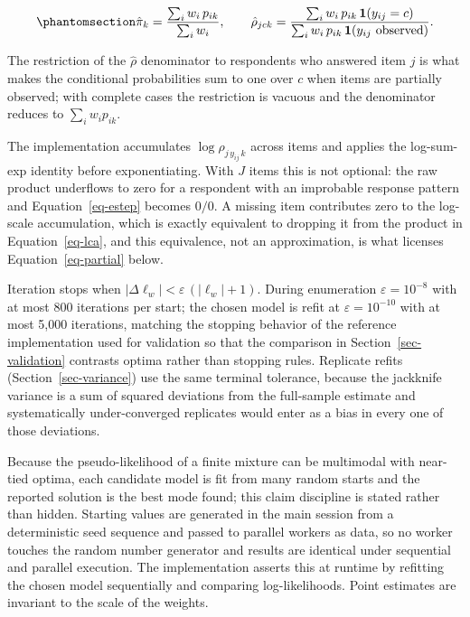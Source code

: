 \documentclass[
  12pt]{article}
\begin{document}
\begin{equation}\phantomsection\label{eq-mstep}{
\hat\pi_k = \frac{\sum_i w_i\, p_{ik}}{\sum_i w_i}, \qquad
\hat\rho_{jck} = \frac{\sum_i w_i\, p_{ik}\, \mathbf{1}(y_{ij} = c)}
{\sum_i w_i\, p_{ik}\, \mathbf{1}(y_{ij} \text{ observed})} .
}\end{equation}

The restriction of the \(\hat\rho\) denominator to respondents who
answered item \(j\) is what makes the conditional probabilities sum to
one over \(c\) when items are partially observed; with complete cases
the restriction is vacuous and the denominator reduces to
\(\sum_i w_i p_{ik}\).

The implementation accumulates \(\log \rho_{j\,y_{ij}\,k}\) across items
and applies the log-sum-exp identity before exponentiating. With \(J\)
items this is not optional: the raw product underflows to zero for a
respondent with an improbable response pattern and
Equation~\ref{eq-estep} becomes \(0/0\). A missing item contributes zero
to the log-scale accumulation, which is exactly equivalent to dropping
it from the product in Equation~\ref{eq-lca}, and this equivalence, not
an approximation, is what licenses Equation~\ref{eq-partial} below.

Iteration stops when \(|\Delta \ell_w| < \varepsilon\,(|\ell_w| + 1)\).
During enumeration \(\varepsilon = 10^{-8}\) with at most 800 iterations
per start; the chosen model is refit at \(\varepsilon = 10^{-10}\) with
at most 5,000 iterations, matching the stopping behavior of the
reference implementation used for validation so that the comparison in
Section~\ref{sec-validation} contrasts optima rather than stopping
rules. Replicate refits (Section~\ref{sec-variance}) use the same
terminal tolerance, because the jackknife variance is a sum of squared
deviations from the full-sample estimate and systematically
under-converged replicates would enter as a bias in every one of those
deviations.

Because the pseudo-likelihood of a finite mixture can be multimodal with
near-tied optima, each candidate model is fit from many random starts
and the reported solution is the best mode found; this claim discipline
is stated rather than hidden. Starting values are generated in the main
session from a deterministic seed sequence and passed to parallel
workers as data, so no worker touches the random number generator and
results are identical under sequential and parallel execution. The
implementation asserts this at runtime by refitting the chosen model
sequentially and comparing log-likelihoods. Point estimates are
invariant to the scale of the weights.
\end{document}
